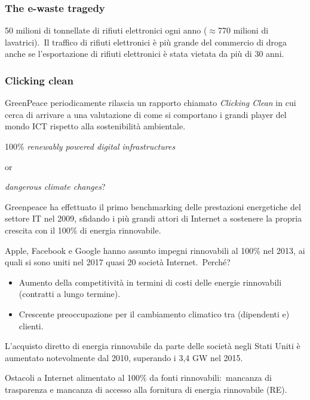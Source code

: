 \subsubsection{The e-waste tragedy}

50 milioni di tonnellate di rifiuti elettronici ogni anno ($\approx$770 milioni di lavatrici).\
Il traffico di rifiuti elettronici è più grande del commercio di droga anche se l'esportazione di rifiuti elettronici è stata vietata da più di 30 anni.\

\subsubsection{Clicking clean}

GreenPeace periodicamente rilascia un rapporto chiamato \textit{Clicking Clean} in cui cerca di arrivare a una valutazione di come si comportano i grandi player del mondo ICT rispetto alla sostenibilità ambientale.

\begin{center}
	100\% \textit{renewably powered digital infrastructures}

	or

	\textit{dangerous climate changes}?
\end{center}

\noindent Greenpeace ha effettuato il primo benchmarking delle prestazioni energetiche del settore IT nel 2009, sfidando i più grandi attori di Internet a sostenere la propria crescita con il 100\% di energia rinnovabile.\

Apple, Facebook e Google hanno assunto impegni rinnovabili al 100\% nel 2013, ai quali si sono uniti nel 2017 quasi 20 società Internet.\
Perché?
\begin{itemize}
	\item Aumento della competitività in termini di costi delle energie rinnovabili (contratti a lungo termine).
	\item Crescente preoccupazione per il cambiamento climatico tra (dipendenti e) clienti.
\end{itemize}

\noindent L'acquisto diretto di energia rinnovabile da parte delle società negli Stati Uniti è aumentato notevolmente dal 2010, superando i 3,4 GW nel 2015.

\begin{flushleft}
	Ostacoli a Internet alimentato al 100\% da fonti rinnovabili:\ mancanza di trasparenza e mancanza di accesso alla fornitura di energia rinnovabile (RE).
\end{flushleft}

